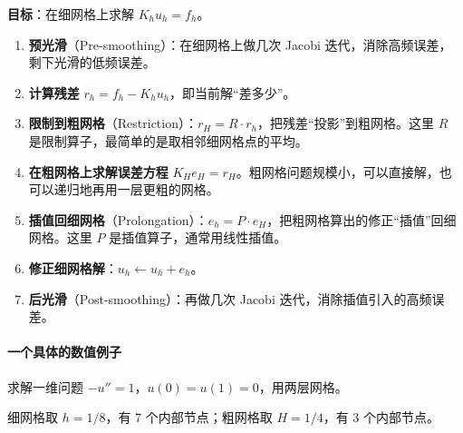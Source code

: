 \begin{tcolorbox}[colback=gray!5, colframe=gray!60, title=两层网格算法（Two-Grid）]
\textbf{目标}：在细网格上求解 $K_h u_h = f_h$。

\begin{enumerate}
    \item \textbf{预光滑}（Pre-smoothing）：在细网格上做几次 Jacobi 迭代，消除高频误差，剩下光滑的低频误差。
    \item \textbf{计算残差} $r_h = f_h - K_h u_h$，即当前解“差多少”。
    \item \textbf{限制到粗网格}（Restriction）：$r_H = R \cdot r_h$，把残差“投影”到粗网格。这里 $R$ 是限制算子，最简单的是取相邻细网格点的平均。
    \item \textbf{在粗网格上求解误差方程} $K_H e_H = r_H$。粗网格问题规模小，可以直接解，也可以递归地再用一层更粗的网格。
    \item \textbf{插值回细网格}（Prolongation）：$e_h = P \cdot e_H$，把粗网格算出的修正“插值”回细网格。这里 $P$ 是插值算子，通常用线性插值。
    \item \textbf{修正细网格解}：$u_h \leftarrow u_h + e_h$。
    \item \textbf{后光滑}（Post-smoothing）：再做几次 Jacobi 迭代，消除插值引入的高频误差。
\end{enumerate}
\end{tcolorbox}

\paragraph{一个具体的数值例子}

求解一维问题 $-u'' = 1$，$u(0) = u(1) = 0$，用两层网格。

细网格取 $h = 1/8$，有 7 个内部节点；粗网格取 $H = 1/4$，有 3 个内部节点。

